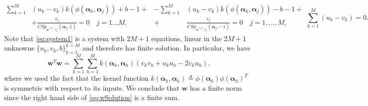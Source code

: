 \documentclass[final,twocolumn]{IEEEtran}
\newcommand{\wrt}{with respect to }
\begin{document}
	\begin{subequations}
		\label{eq:system1}
		\begin{equation}
		\begin{split}
		\sum_{k=1}^{M} &(u_k - v_k) k(\phi (\bm{\alpha}_k,\bm{\alpha}_j)) + b - 1 + \\ 
		&+ \frac{v_j}{CSp_{\bm{a}^{(i)},t_i}(\bm{\alpha}_j,1)} = 0
		\quad j=1\dots M,
		\end{split}
		\end{equation}
		\begin{equation}
		\begin{split}
		- \sum_{k=1}^{M} &(u_k - v_k) k(\phi (\bm{\alpha}_k,\bm{\alpha}_j)) - b - 1 + \\+
		& \frac{v_j}{CSp_{\bm{a}^{(i)},t_i}(\bm{\alpha}_j,-1)} = 0
		\quad j=1,\dots, M,
		\end{split}
		\end{equation}		
		\begin{equation}
		\sum_{k=1}^{M} (u_k - v_k) = 0.
		\end{equation}
	\end{subequations}
	Note that \eqref{eq:system1} is a system with $2M + 1$ equations, linear in the $2M + 1$ unknowns $\{u_k,v_k,b\}_{k=1}^{k=M}$ and therefore has finite solution. In particular, we have
	\begin{equation}
	\label{eq:wSolution}
	\bm{w}^T\bm{w} =  \sum_{k=1}^{M} \sum_{h=1}^{M} k(\bm{\alpha}_k,\bm{\alpha}_h) (v_kv_h + u_ku_h -2 v_ku_h),
	\end{equation}
	where we used the fact that the kernel function
$
	k(\bm{\alpha}_k,\bm{\alpha}_h) \triangleq \phi(\bm{\alpha}_k) \phi(\bm{\alpha}_h)^T
$
	 is symmetric \wrt its inputs. 	We conclude that $\bm{w}$ has a finite norm since the right hand side of \eqref{eq:wSolution} is a finite sum.

%
%
\renewcommand*{\bibfont}{\footnotesize}

\printbibliography
\end{document}
